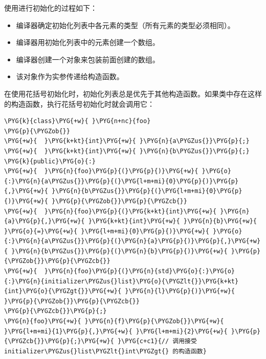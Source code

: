 
使用进行初始化的过程如下：



\begin{itemize}
\item 编译器确定初始化列表中各元素的类型（所有元素的类型必须相同）。



\item 编译器用初始化列表中的元素创建一个数组。



\item 编译器创建一个对象来包装前面创建的数组。



\item 该对象作为实参传递给构造函数。

\end{itemize}



在使用花括号初始化时，初始化列表总是优先于其他构造函数。如果类中存在这样的构造函数，执行花括号初始化时就会调用它：



\begin{codeblockbg}
\begin{Verbatim}[commandchars=\\\{\},breaklines=true,breakanywhere=true,fontsize=\codefont,xleftmargin=17bp]
\PYG{k}{class}\PYG{+w}{ }\PYG{n+nc}{foo}
\PYG{p}{\PYGZob{}}
\PYG{+w}{  }\PYG{k+kt}{int}\PYG{+w}{ }\PYG{n}{a\PYGZus{}}\PYG{p}{;}
\PYG{+w}{  }\PYG{k+kt}{int}\PYG{+w}{ }\PYG{n}{b\PYGZus{}}\PYG{p}{;}
\PYG{k}{public}\PYG{o}{:}
\PYG{+w}{  }\PYG{n}{foo}\PYG{p}{(}\PYG{p}{)}\PYG{+w}{ }\PYG{o}{:}\PYG{n}{a\PYGZus{}}\PYG{p}{(}\PYG{l+m+mi}{0}\PYG{p}{)}\PYG{p}{,}\PYG{+w}{ }\PYG{n}{b\PYGZus{}}\PYG{p}{(}\PYG{l+m+mi}{0}\PYG{p}{)}\PYG{+w}{ }\PYG{p}{\PYGZob{}}\PYG{p}{\PYGZcb{}}
\PYG{+w}{  }\PYG{n}{foo}\PYG{p}{(}\PYG{k+kt}{int}\PYG{+w}{ }\PYG{n}{a}\PYG{p}{,}\PYG{+w}{ }\PYG{k+kt}{int}\PYG{+w}{ }\PYG{n}{b}\PYG{+w}{ }\PYG{o}{=}\PYG{+w}{ }\PYG{l+m+mi}{0}\PYG{p}{)}\PYG{+w}{ }\PYG{o}{:}\PYG{n}{a\PYGZus{}}\PYG{p}{(}\PYG{n}{a}\PYG{p}{)}\PYG{p}{,}\PYG{+w}{ }\PYG{n}{b\PYGZus{}}\PYG{p}{(}\PYG{n}{b}\PYG{p}{)}\PYG{+w}{ }\PYG{p}{\PYGZob{}}\PYG{p}{\PYGZcb{}}
\PYG{+w}{  }\PYG{n}{foo}\PYG{p}{(}\PYG{n}{std}\PYG{o}{:}\PYG{o}{:}\PYG{n}{initializer\PYGZus{}list}\PYG{o}{\PYGZlt{}}\PYG{k+kt}{int}\PYG{o}{\PYGZgt{}}\PYG{+w}{ }\PYG{n}{l}\PYG{p}{)}\PYG{+w}{ }\PYG{p}{\PYGZob{}}\PYG{p}{\PYGZcb{}}
\PYG{p}{\PYGZcb{}}\PYG{p}{;}
\PYG{n}{foo}\PYG{+w}{ }\PYG{n}{f}\PYG{p}{\PYGZob{}}\PYG{+w}{ }\PYG{l+m+mi}{1}\PYG{p}{,}\PYG{+w}{ }\PYG{l+m+mi}{2}\PYG{+w}{ }\PYG{p}{\PYGZcb{}}\PYG{p}{;}\PYG{+w}{ }\PYG{c+c1}{// 调用接受 initializer\PYGZus{}list\PYGZlt{}int\PYGZgt{} 的构造函数}
\end{Verbatim}
\end{codeblockbg}


